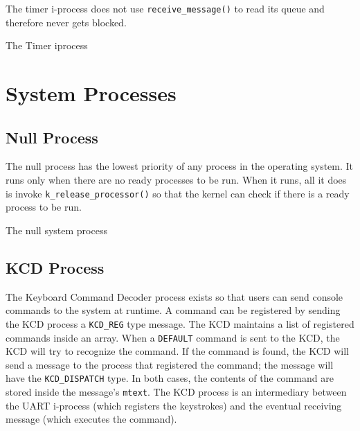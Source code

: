 \documentclass[12pt]{report}
\begin{document}
The timer i-process does not use {\tt receive\_message()} to read its queue and therefore never gets blocked.\\

\begin{algorithm}
  \caption{The Timer iprocess}
  \begin{algorithmic}[1]
			\EndIf
		\EndFor
    \EndProcedure
  \end{algorithmic}
\end{algorithm}



\section{System Processes}

\subsection{Null Process}

The null process has the lowest priority of any process in the operating system. It runs only when there are no ready processes to be run. When it runs, all it does is invoke {\tt k\_release\_processor()} so that the kernel can check if there is a ready process to be run.

\begin{algorithm}
  \caption{The null system process}
  \begin{algorithmic}[1]
			\State {}
		\EndWhile
    \EndProcedure
  \end{algorithmic}
\end{algorithm}

\subsection{KCD Process}

The Keyboard Command Decoder process exists so that users can send console commands to the system at runtime. A command can be registered by sending the KCD process a {\tt KCD\_REG} type message. The KCD maintains a list of registered commands inside an array. When a {\tt DEFAULT} command is sent to the KCD, the KCD will try to recognize the command. If the command is found, the KCD will send a message to the process that registered the command; the message will have the {\tt KCD_DISPATCH} type. In both cases, the contents of the command are stored inside the message's {\tt mtext}. The KCD process is an intermediary between the UART i-process (which registers the keystrokes) and the eventual receiving message (which executes the command).\\
\end{document}
